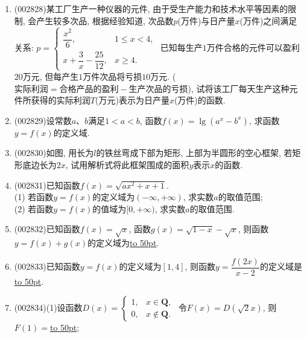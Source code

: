 \documentclass[10pt,a4paper]{article}
\newcommand{\blank}[1]{\underline{\hbox to #1pt{}}}
\begin{document}
\begin{enumerate}[1.]
\begin{center}
\end{center}
(1) 写出函数$y=f(x)$在$x<0$时的单调性:\blank{50};\\
(2) 写出$f(f(-2))$的值:\blank{50};\\
(3) 写出方程$f(x)=\dfrac{\sqrt 3}2$的解集:\blank{50}.
\item {\tiny (002828)}某工厂生产一种仪器的元件, 由于受生产能力和技术水平等因素的限制, 会产生较多次品, 根据经验知道, 次品数$p$(万件)与日产量$x$(万件)之间满足关系: $p=\begin{cases}  \dfrac{x^2}6,  &1\le x<4, \\ x+\dfrac 3x-\dfrac{25}{12}, & x\ge 4. \end{cases}$ 已知每生产$1$万件合格的元件可以盈利$20$万元, 但每产生$1$万件次品将亏损$10$万元. ($\text{实际利润}=\text{合格产品的盈利}-\text{生产次品的亏损}$), 试将该工厂每天生产这种元件所获得的实际利润$T$(万元)表示为日产量$x$(万件)的函数.
\item {\tiny (002829)}设常数$a$、$b$满足$1<a<b$, 函数$f(x)=\lg(a^x-b^x)$, 求函数$y=f(x)$的定义域.
\item {\tiny (002830)}如图, 用长为$l$的铁丝弯成下部为矩形, 上部为半圆形的空心框架, 若矩形底边长为$2x$, 试用解析式将此框架围成的面积$y$表示$x$的函数.
\begin{center}
\end{center}
\item {\tiny (002831)}已知函数$f(x)=\sqrt{ax^2+x+1}$.\\
(1) 若函数$y=f(x)$的定义域为$(-\infty ,+\infty)$, 求实数$a$的取值范围;\\
(2) 若函数$y=f(x)$的值域为$[0,+\infty)$, 求实数$a$的取值范围.
\item {\tiny (002832)}已知函数$f(x)=\sqrt x$, 函数$g(x)=\sqrt{1-x}-\sqrt x$, 则函数$y=f(x)+g(x)$的定义域为\blank{50}.
\item {\tiny (002833)}已知函数$y=f(x)$的定义域为$[1,4]$, 则函数$y=\dfrac{f(2x)}{x-2}$的定义域是\blank{50}.
\item {\tiny (002834)}(1)设函数$D(x)=\begin{cases} 1, & x\in \mathbf{Q}, \\  0, &x\notin\mathbf{Q}. \end{cases}$ 令$F(x)=D(\sqrt 2x)$, 则$F(1)=$\blank{50};\\

\end{enumerate}
\end{document}
